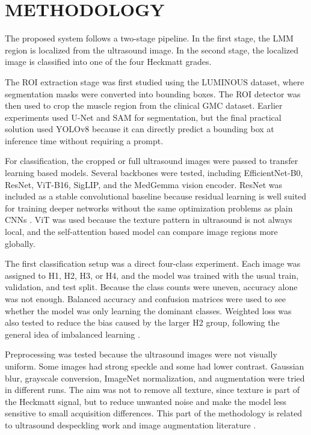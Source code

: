 \chapter{METHODOLOGY}
\label{methodology}
The proposed system follows a two-stage pipeline. In the first stage, the LMM region is localized from the ultrasound image. In the second stage, the localized image is classified into one of the four Heckmatt grades.

The ROI extraction stage was first studied using the LUMINOUS dataset, where segmentation masks were converted into bounding boxes. The ROI detector was then used to crop the muscle region from the clinical GMC dataset. Earlier experiments used U-Net and SAM for segmentation, but the final practical solution used YOLOv8 because it can directly predict a bounding box at inference time without requiring a prompt.

For classification, the cropped or full ultrasound images were passed to transfer learning based models. Several backbones were tested, including EfficientNet-B0, ResNet, ViT-B16, SigLIP, and the MedGemma vision encoder. ResNet was included as a stable convolutional baseline because residual learning is well suited for training deeper networks without the same optimization problems as plain CNNs \cite{he2016resnet}. ViT was used because the texture pattern in ultrasound is not always local, and the self-attention based model can compare image regions more globally.

The first classification setup was a direct four-class experiment. Each image was assigned to H1, H2, H3, or H4, and the model was trained with the usual train, validation, and test split. Because the class counts were uneven, accuracy alone was not enough. Balanced accuracy and confusion matrices were used to see whether the model was only learning the dominant classes. Weighted loss was also tested to reduce the bias caused by the larger H2 group, following the general idea of imbalanced learning \cite{HeGarcia2009,Cui2019}.

Preprocessing was tested because the ultrasound images were not visually uniform. Some images had strong speckle and some had lower contrast. Gaussian blur, grayscale conversion, ImageNet normalization, and augmentation were tried in different runs. The aim was not to remove all texture, since texture is part of the Heckmatt signal, but to reduce unwanted noise and make the model less sensitive to small acquisition differences. This part of the methodology is related to ultrasound despeckling work \cite{YuActon2002,Loizou2005} and image augmentation literature \cite{Shorten2019,Cubuk2019}.

